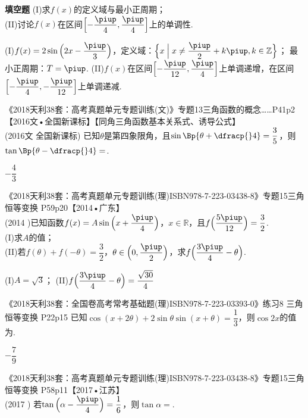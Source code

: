 \begin{exercise}{\bf 填空题}
      (I)求$f(x)$的定义域与最小正周期；\\
      (II)讨论$f(x)$在区间$\Bigl[-\dfrac{\piup}4,\dfrac{\piup}4\Bigr]$上的单调性.
      \begin{answer}
        (I)$f(x)=2\sin{\Bigl(2x-\dfrac{\piup}3\Bigr)}$，定义域：$\Bigl\{x\Bigm|x\neq \dfrac{\piup}2+k\piup,k\in\mathbb{Z}\Bigr\}$；
        最小正周期：$T=\piup$.
        (II)$f(x)$在区间$\Bigl[-\dfrac{\piup}{12},\dfrac{\piup}4\Bigr]$上单调递增，在区间$\Bigl[-\dfrac{\piup}4,-\dfrac{\piup}{12}\Bigr]$上单调递减.
      \end{answer}
    \item 《2018天利38套：高考真题单元专题训练(文)》专题13三角函数的概念……P41p2【2016文•全国新课标】【同角三角函数基本关系式、诱导公式】\\
      {\kaishu (2016文 \textbullet 全国新课标)}
      已知$\theta$是第四象限角，且$\sin\Bp{\theta+\dfracp{}4}=\dfrac35$，则$\tan\Bp{\theta-\dfracp{}4}=$\tk.
      \begin{answer}
        $-\dfrac43$
      \end{answer}
    \item 《2018天利38套：高考真题单元专题训练(理)ISBN978-7-223-03438-8》专题15三角恒等变换 P59p20【2014•广东】\\
      (2014 )已知函数$f(x)=A\sin{\Bigl(x+\dfrac{\piup}4\Bigr)}$，$x\in\mathbb{R}$，且$f\Bigl(\dfrac{5\piup}{12}\Bigr)=\dfrac{3}2$.\\
      (I)求$A$的值；\\
      (II)若$f(\theta)+f(-\theta)=\dfrac{3}2$，$\theta\in \Bigl(0,\dfrac{\piup}2\Bigr)$，求$f\Bigl(\dfrac{3\piup}4-\theta\Bigr)$.
      \begin{answer}
        (I)$A=\sqrt{3}$；
        (II)$f\Bigl(\dfrac{3\piup}4-\theta\Bigr)=\dfrac{\sqrt{30}}4$
      \end{answer}
    \item 《2018天利38套：全国卷高考常考基础题(理)ISBN978-7-223-03393-0》练习8 三角恒等变换 P22p15
      已知$\cos(x+2\theta)+2\sin\theta\sin(x+\theta)=\dfrac{1}3$，则$\cos{2x}$的值为\tk.
      \begin{answer}
        $-\dfrac{7}9$
      \end{answer}
    \item 《2018天利38套：高考真题单元专题训练(理)ISBN978-7-223-03438-8》专题15三角恒等变换 P58p11【2017•江苏】\\
      (2017 )
      若$\tan{\Bigl(\alpha-\dfrac{\piup}4\Bigr)}=\dfrac{1}6$，则$\tan\alpha=$\tk.
      \begin{answer}

\end{answer}
\end{exercise}

